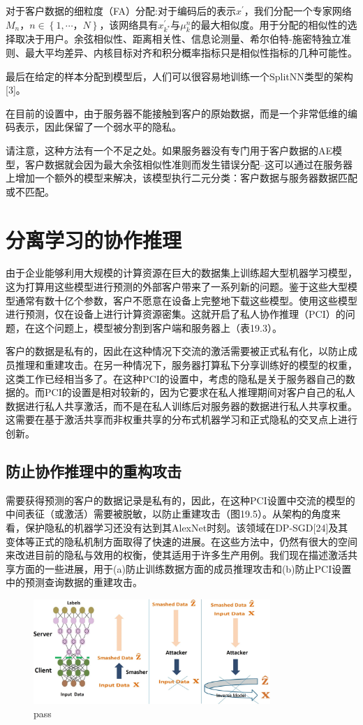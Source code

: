 对于客户数据的细粒度（FA）分配:对于编码后的表示$x^{'}$，我们分配一个专家网络$M_{n}，n \in \left\{ 1, \cdots，N \right\}$，该网络具有$x^{'}_{k^{*}}$与$\mu^{n}_{k}$的最大相似度。用于分配的相似性的选择取决于用户。余弦相似性、距离相关性、信息论测量、希尔伯特-施密特独立准则、最大平均差异、内核目标对齐和积分概率指标只是相似性指标的几种可能性。

最后在给定的样本分配到模型后，人们可以很容易地训练一个SplitNN类型的架构[3]。

在目前的设置中，由于服务器不能接触到客户的原始数据，而是一个非常低维的编码表示，因此保留了一个弱水平的隐私。

请注意，这种方法有一个不足之处。如果服务器没有专门用于客户数据的AE模型，客户数据就会因为最大余弦相似性准则而发生错误分配--这可以通过在服务器上增加一个额外的模型来解决，该模型执行二元分类：客户数据与服务器数据匹配或不匹配。

\section{分离学习的协作推理}
由于企业能够利用大规模的计算资源在巨大的数据集上训练超大型机器学习模型，这为打算用这些模型进行预测的外部客户带来了一系列新的问题。鉴于这些大型模型通常有数十亿个参数，客户不愿意在设备上完整地下载这些模型。使用这些模型进行预测，仅在设备上进行计算资源密集。这就开启了私人协作推理（PCI）的问题，在这个问题上，模型被分割到客户端和服务器上（表19.3）。

客户的数据是私有的，因此在这种情况下交流的激活需要被正式私有化，以防止成员推理和重建攻击。在另一种情况下，服务器打算私下分享训练好的模型的权重，这类工作已经相当多了。在这种PCI的设置中，考虑的隐私是关于服务器自己的数据的。而PCI的设置是相对较新的，因为它要求在私人推理期间对客户自己的私人数据进行私人共享激活，而不是在私人训练后对服务器的数据进行私人共享权重。这需要在基于激活共享而非权重共享的分布式机器学习和正式隐私的交叉点上进行创新。

\subsection{防止协作推理中的重构攻击}
需要获得预测的客户的数据记录是私有的，因此，在这种PCI设置中交流的模型的中间表征（或激活）需要被脱敏，以防止重建攻击（图19.5）。从架构的角度来看，保护隐私的机器学习还没有达到其AlexNet时刻。该领域在DP-SGD[24]及其变体等正式的隐私机制方面取得了快速的进展。在这些方法中，仍然有很大的空间来改进目前的隐私与效用的权衡，使其适用于许多生产用例。我们现在描述激活共享方面的一些进展，用于(a)防止训练数据方面的成员推理攻击和(b)防止PCI设置中的预测查询数据的重建攻击。
\begin{figure}
	\centering
	\includegraphics[width=0.8\textwidth]{chapter19/images/Fig.19.5}
	\caption{pass} \label{fig:19.5}
\end{figure}

